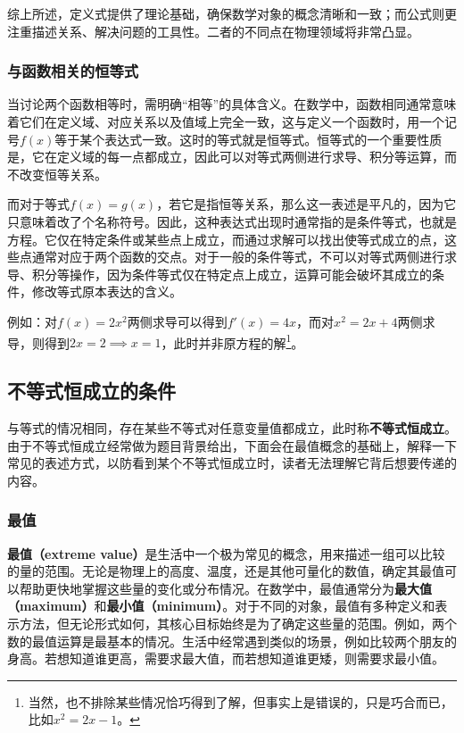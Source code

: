 综上所述，定义式提供了理论基础，确保数学对象的概念清晰和一致；而公式则更注重描述关系、解决问题的工具性。二者的不同点在物理领域将非常凸显。

\subsubsection{与函数相关的恒等式}
当讨论两个函数相等时，需明确“相等”的具体含义。在数学中，函数相同通常意味着它们在定义域、对应关系以及值域上完全一致，这与定义一个函数时，用一个记号$f(x)$等于某个表达式一致。这时的等式就是恒等式。恒等式的一个重要性质是，它在定义域的每一点都成立，因此可以对等式两侧进行求导、积分等运算，而不改变恒等关系。

而对于等式$f(x)=g(x)$，若它是指恒等关系，那么这一表述是平凡的，因为它只意味着改了个名称符号。因此，这种表达式出现时通常指的是条件等式，也就是方程。它仅在特定条件或某些点上成立，而通过求解可以找出使等式成立的点，这些点通常对应于两个函数的交点。对于一般的条件等式，不可以对等式两侧进行求导、积分等操作，因为条件等式仅在特定点上成立，运算可能会破坏其成立的条件，修改等式原本表达的含义。

例如：对$f(x)=2x^2$两侧求导可以得到$f'(x)=4x$，而对$x^2=2x+4$两侧求导，则得到$2x=2\implies x=1$，此时并非原方程的解\footnote{当然，也不排除某些情况恰巧得到了解，但事实上是错误的，只是巧合而已，比如$x^2=2x-1$。}。

\subsection{不等式恒成立的条件}

与等式的情况相同，存在某些不等式对任意变量值都成立，此时称\textbf{不等式恒成立}。由于不等式恒成立经常做为题目背景给出，下面会在最值概念的基础上，解释一下常见的表述方式，以防看到某个不等式恒成立时，读者无法理解它背后想要传递的内容。

\subsubsection{最值}

\textbf{最值（extreme value）}是生活中一个极为常见的概念，用来描述一组可以比较的量的范围。无论是物理上的高度、温度，还是其他可量化的数值，确定其最值可以帮助更快地掌握这些量的变化或分布情况。在数学中，最值通常分为\textbf{最大值（maximum）}和\textbf{最小值（minimum）}。对于不同的对象，最值有多种定义和表示方法，但无论形式如何，其核心目标始终是为了确定这些量的范围。例如，两个数的最值运算是最基本的情况。生活中经常遇到类似的场景，例如比较两个朋友的身高。若想知道谁更高，需要求最大值，而若想知道谁更矮，则需要求最小值。

